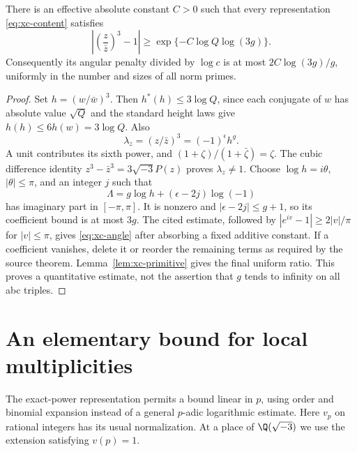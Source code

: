 \begin{theorem}\label{thm:xc-angle}
There is an effective absolute constant $C>0$ such that every representation
\eqref{eq:xc-content} satisfies
\begin{equation}\label{eq:xc-angle}
 \left|\left(\frac z{\bar z}\right)^3-1\right|
 \ge \exp\{-C\log Q\log(3g)\}.
\end{equation}
Consequently its angular penalty divided by $\log c$ is at most
$2C\log(3g)/g$, uniformly in the number and sizes of all norm primes.
\end{theorem}
\begin{proof}
Set $h=(w/\bar w)^3$. Then $h^*(h)\le3\log Q$, since each conjugate of
$w$ has absolute value $\sqrt Q$ and the standard height laws give
$h(h)\le6h(w)=3\log Q$. Also
\[
 \lambda_z=(z/\bar z)^3=(-1)^\epsilon h^g.
\]
A unit contributes its sixth power, and
$(1+\zeta)/(1+\bar\zeta)=\zeta$. The cubic difference identity
$z^3-\bar z^3=3\sqrt{-3}P(z)$ proves $\lambda_z\ne1$.
Choose $\log h=i\theta$, $|\theta|\le\pi$, and an integer $j$ such that
\[
 \Lambda=g\log h+(\epsilon-2j)\log(-1)
\]
has imaginary part in $[-\pi,\pi]$. It is nonzero and
$|\epsilon-2j|\le g+1$, so its coefficient bound is at most $3g$.
The cited estimate, followed by $|e^{iv}-1|\ge2|v|/\pi$ for $|v|\le\pi$,
gives \eqref{eq:xc-angle} after absorbing a fixed additive constant.
If a coefficient vanishes, delete it or reorder the remaining terms as
required by the source theorem. Lemma~\ref{lem:xc-primitive} gives the final
uniform ratio. This proves a quantitative estimate, not the assertion that
$g$ tends to infinity on all abc triples.
\end{proof}

\section{An elementary bound for local multiplicities}
\label{sec:xc-local}
The exact-power representation permits a bound linear in $p$, using order
and binomial expansion instead of a general $p$-adic logarithmic estimate.
Here $v_p$ on rational integers has its usual normalization. At a place of
$\Q(\sqrt{-3})$ we use the extension satisfying $v(p)=1$.

